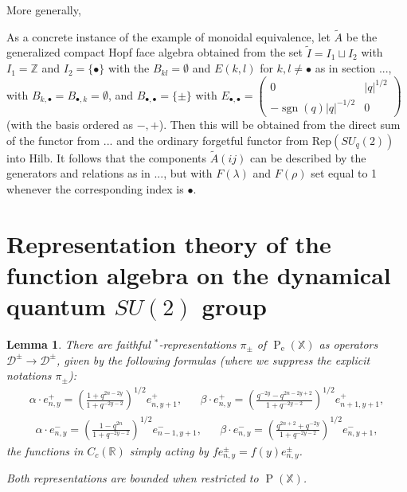 \documentclass[12pt]{article}
\theoremstyle{change}
\DeclareMathOperator{\ext}{\mathrm{e}}
\DeclareMathOperator{\Pol}{\mathrm{P}}
\DeclareMathOperator{\sgn}{\mathrm{sgn}}
\newcommand{\R}{\mathbb{R}}
\newcommand{\Z}{\mathbb{Z}}
\newcommand{\X}{\mathbb{X}}
\newcommand{\Hilb}{\mathrm{Hilb}}
\newcommand{\Rep}{\mathrm{Rep}}
\newtheorem{Lem}[Theorem]{Lemma}
\theoremstyle{definition}
\numberwithin{equation}{section}
\begin{document}
More generally, 

As a concrete instance of the example of monoidal equivalence, let $\tilde{A}$ be the generalized compact Hopf face algebra obtained from the set $\tilde{I} =I_1\sqcup I_2$ with $I_1= \Z$ and $I_2= \{\bullet\}$ with the $B_{kl} =\emptyset$ and $E(k,l)$ for $k,l\neq \bullet$ as in section ..., with $B_{k,\bullet} = B_{\bullet,k}= \emptyset$, and $B_{\bullet,\bullet} = \{\pm\}$ with $E_{\bullet,\bullet} = \begin{pmatrix} 0 & |q|^{1/2} \\ -\sgn(q)|q|^{-1/2}&0\end{pmatrix}$ (with the basis ordered as $-,+$). Then this will be obtained from the direct sum of the functor from ... and the ordinary forgetful functor from $\Rep(SU_q(2))$ into $\Hilb$. It follows that the components $\tilde{A}(ij)$ can be described by the generators and relations as in ..., but with $F(\lambda)$ and $F(\rho)$ set equal to 1 whenever the corresponding index is $\bullet$.





\section*{Representation theory of the function algebra on the dynamical quantum $SU(2)$ group}

\begin{Lem} There are faithful $^*$-representations $\pi_{\pm}$ of $\Pol_{\ext}(\X)$ as operators $\mathscr{D}^{\pm}\rightarrow \mathscr{D}^{\pm}$, given by the following formulas (where we suppress the explicit notations $\pi_{\pm}$): \begin{align*} \alpha\cdot e_{n,y}^+ = \left(\frac{1+q^{2n-2y}}{1+q^{-2y-2}}\right)^{1/2}e_{n,y+1}^+,&& \beta\cdot e_{n,y}^+ = \left(\frac{q^{-2y}-q^{2n-2y+2}}{1+q^{-2y-2}}\right)^{1/2}e_{n+1,y+1}^+,\end{align*}
\begin{align*} \alpha\cdot e_{n,y}^- = \left(\frac{1-q^{2n}}{1+q^{-2y-2}}\right)^{1/2}e_{n-1,y+1}^-,&& \beta\cdot e_{n,y}^- = \left(\frac{q^{2n+2}+q^{-2y}}{1+q^{-2y-2}}\right)^{1/2}e_{n,y+1}^-,\end{align*} the functions in $C_c(\R)$ simply acting by $fe_{n,y}^{\pm}= f(y)e_{n,y}^{\pm}$.

Both representations are bounded when restricted to $\Pol(\X)$.
\end{Lem}
\end{document}
